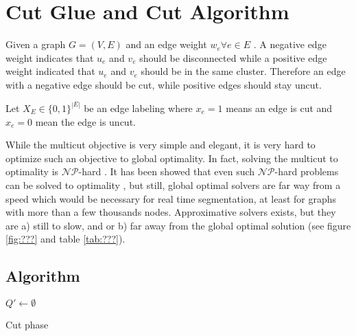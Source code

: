 \flushleft
\chapter{Cut Glue and Cut Algorithm}\label{ch:cgc} 



Given a graph $G=(V,E)$ and an edge weight $w_e  \forall e \in E $ .
A negative edge weight indicates that $u_e$ and $v_e$ should be
disconnected while a positive edge weight indicated that $u_e$ and $v_e$ should be in the same cluster. Therefore an edge with a negative edge should be cut, while positive edges should stay uncut.

Let $X_E \in \{0,1\}^{|E|}$ be an edge labeling where $x_e=1$ means an edge is
cut and $x_e=0$ mean the edge is uncut. 





While the multicut objective is very simple and elegant, it is very
hard to optimize such an objective to global optimality.
In fact, solving the multicut to optimality is $\mathcal{NP}$-hard \cite{???} 
.
It has been showed that even such $\mathcal{NP}$-hard problems can
be solved to optimality \cite{andres_2011_iccv,kappes_2011_emmcvpr}, but still,
global optimal solvers are far way from a  speed which would be necessary for
real time segmentation, at least for  graphs with more than a few thousands nodes. 
Approximative solvers exists, but they are a) still to slow, and or b) far away from the global optimal solution (see figure \ref{fig:???} and table \ref{tab:???}).




\section{Algorithm}

    \begin{algorithm}
        \ifx\DontPrintSemicolon\undefined
        \else
        \DontPrintSemicolon
        \fi
        $Q' \leftarrow \emptyset$\;
        \caption{Cut phase\label{alg:cut_phase}}

    \end{algorithm}


